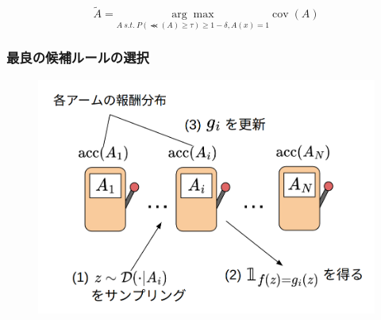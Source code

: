 \documentclass[aspectratio=169]{slide-ja}
\begin{document}
\begin{frame}
  \begin{algorithm}[H]
    
  \end{algorithm}
  \vspace{-2em}
  \begin{equation}
    \tilde{A}=\underset{A\ s.t.
      \ P(\Prec(A)\ge\tau)\ge1-\delta,A(x)=1}
    {\arg\max}\operatorname{cov}(A)
  \end{equation}
\end{frame}

\begin{frame}
  \begin{algorithm}[H]
    
  \end{algorithm}
\end{frame}

\begin{frame}
  \begin{algorithm}[H]
    \small
    
  \end{algorithm}
\end{frame}

\begin{frame}
  \begin{algorithm}[H]
    
  \end{algorithm}
\end{frame}

\begin{frame}
  \frametitle{最良の候補ルールの選択}
  \begin{figure}
    \centering
    \includegraphics[height=\textheight-40pt]{src/bandit}
  \end{figure}
\end{frame}
\end{document}
